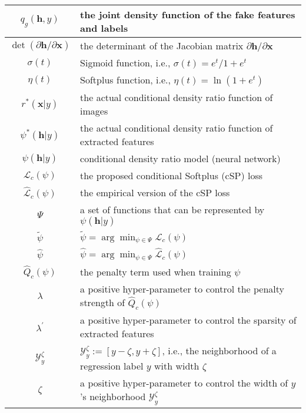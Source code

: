 \documentclass[final,12pt, 3p,times]{elsarticle}
\begin{document}
\begin{table}[!h]
\begin{adjustbox}{width=1\textwidth}
\begin{tabular}{c|l}
			\hline
			$q_g(\bm{h},y)$ & the joint density function of the fake features and labels  \\
			\hline
			$\det\left(\partial\bm{h} / \partial\bm{x}\right)$ & the determinant of the Jacobian matrix $\partial\bm{h} / \partial\bm{x}$ \\
			\hline
			$\sigma(t)$ &  Sigmoid function, i.e., $\sigma(t)={e^t}/{1+e^t}$   \\
			\hline
			$\eta(t)$   &  Softplus function, i.e., $\eta(t)=\ln{(1+e^t)}$      \\
			\hline
			$r^*(\bm{x}|y)$   &   the actual conditional density ratio function  of images  \\
			\hline
			$\psi^*(\bm{h}|y)$   &   the actual conditional density ratio function of extracted features  \\
			\hline
			$\psi(\bm{h}|y)$   &   conditional density ratio model (neural network)  \\
			\hline
			$\mathcal{L}_c(\psi)$ & the proposed conditional Softplus (cSP) loss \\
			\hline
			$\widehat{\mathcal{L}}_c(\psi)$ & the empirical version of the cSP loss \\
			\hline
			$\Psi$   &  a set of functions that can be represented by $\psi(\bm{h}|y)$  \\
			\hline
			$\tilde{\psi}$ & $\tilde{\psi}=\arg\min_{\psi\in\Psi}\mathcal{L}_c(\psi)$ \\
			\hline
			$\hat{\psi}$ & $\hat{\psi}=\arg\min_{\psi\in\Psi}\widehat{\mathcal{L}}_c(\psi)$ \\
			\hline
			$\widehat{Q}_c(\psi)$   &  the penalty term used when training $\psi$    \\
			\hline
			$\lambda$ & a positive hyper-parameter to control the penalty strength of $\widehat{Q}_c(\psi)$  \\
			\hline
			$\lambda^\prime$ & a positive hyper-parameter to control the sparsity of extracted features  \\
			\hline
			$\mathcal{Y}_y^{\zeta}$ & $\mathcal{Y}_y^{\zeta}:=[y-\zeta, y+\zeta]$, i.e., the neighborhood of a regression label $y$ with width $\zeta$ \\
			\hline
			$\zeta$ & a positive hyper-parameter to control the width of $y$'s neighborhood $\mathcal{Y}_y^{\zeta}$ \\
			\bottomrule
		\end{tabular}\end{adjustbox}
	\label{tab:definition_symbols}\end{table}
\end{document}
